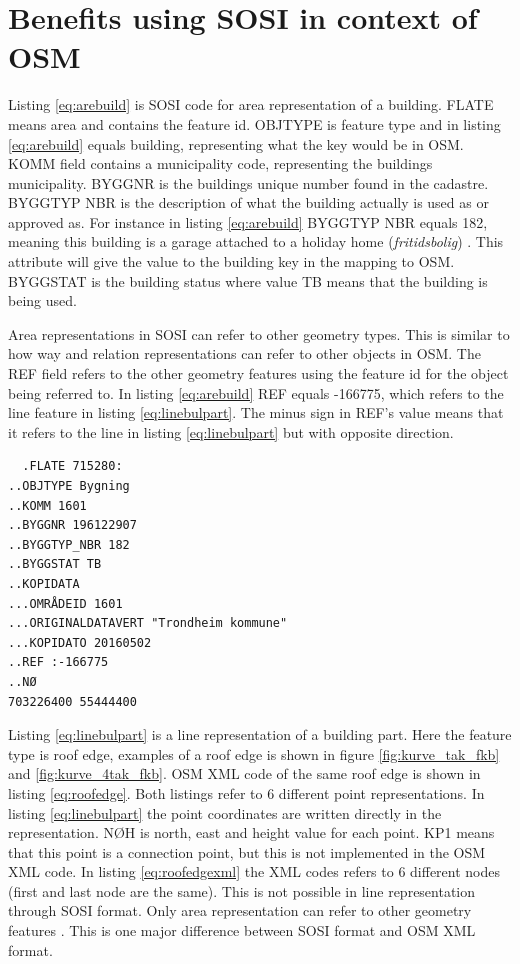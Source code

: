 \section{Benefits using SOSI in context of OSM}\label{sec:sosiosm}

Listing \ref{eq:arebuild} is SOSI code for area representation of a building. FLATE means area and contains the feature id. OBJTYPE is feature type and in listing \ref{eq:arebuild} equals building, representing what the key would be in OSM. KOMM field contains a municipality code, representing the buildings municipality. BYGGNR is the buildings unique number found in the cadastre. BYGGTYP NBR is the description of what the building actually is used as or approved as. For instance in listing \ref{eq:arebuild} BYGGTYP NBR equals 182, meaning this building is a garage attached to a holiday home (\textit{fritidsbolig}) \cite{SOSI-sekretariatet}. This attribute will give the value to the building key in the mapping to OSM. BYGGSTAT is the building status where value TB means that the building is being used. 

Area representations in SOSI can refer to other geometry types. This is similar to how way and relation representations can refer to other objects in OSM. The REF field refers to the other geometry features using the feature id for the object being referred to. In listing \ref{eq:arebuild} REF equals -166775, which refers to the line feature in listing \ref{eq:linebulpart}. The minus sign in REF's value means that it refers to the line in listing \ref{eq:linebulpart} but with opposite direction. 

\begin{lstlisting}
  .FLATE 715280:
..OBJTYPE Bygning
..KOMM 1601
..BYGGNR 196122907
..BYGGTYP_NBR 182
..BYGGSTAT TB
..KOPIDATA
...OMRÅDEID 1601
...ORIGINALDATAVERT "Trondheim kommune"
...KOPIDATO 20160502
..REF :-166775
..NØ
703226400 55444400
\end{lstlisting}

Listing \ref{eq:linebulpart} is a line representation of a building part. Here the feature type is roof edge, examples of a roof edge is shown in figure \ref{fig:kurve_tak_fkb} and \ref{fig:kurve_4tak_fkb}. OSM XML code of the same roof edge is shown in listing \ref{eq:roofedge}. Both listings refer to 6 different point representations. In listing \ref{eq:linebulpart} the point coordinates are written directly in the representation. NØH is north, east and height value for each point. KP1 means that this point is a connection point, but this is not implemented in the OSM XML code. In listing \ref{eq:roofedgexml} the XML codes refers to 6 different nodes (first and last node are the same). This is not possible in line representation through SOSI format. Only area representation can refer to other geometry features \cite{Kartverket2006}. This is one major difference between SOSI format and OSM XML format. 

